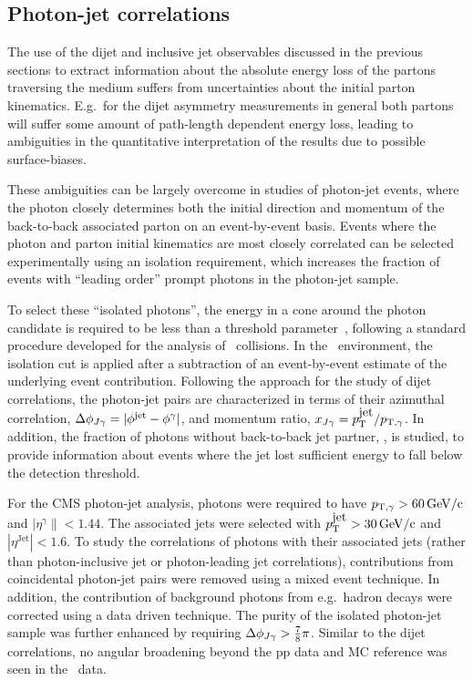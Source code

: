 \subsection{Photon-jet correlations}

The use of the dijet and inclusive jet observables discussed in the previous sections 
to extract information
about the absolute energy loss of the partons traversing the medium suffers from
uncertainties about the initial parton kinematics. E.g.\ for the dijet asymmetry 
measurements in general both partons will suffer some amount of path-length dependent
energy loss, leading to ambiguities in the quantitative interpretation of the results
due to possible surface-biases. 

These ambiguities can be largely overcome in studies of photon-jet events, 
where the photon closely determines both the initial direction and momentum 
of the back-to-back associated parton on an event-by-event basis.
Events where the photon and parton initial kinematics are most closely correlated 
can be selected experimentally using an isolation requirement, which 
increases the fraction of events with ``leading order'' prompt photons in
the photon-jet sample. 

To select these ``isolated photons'', the energy in a cone around 
the photon candidate is required to be less than a threshold parameter~\cite{HIPhoton},
following a standard procedure developed for the analysis of \pp\ collisions. In the \PbPb\ 
environment, the isolation cut is applied after a subtraction of an event-by-event 
estimate of the underlying event contribution.
Following the approach for the study of dijet correlations, the photon-jet pairs 
are characterized in terms of their azimuthal correlation, $\Delta\phi_{J\gamma} = |\phi^\mathrm{jet} - \phi^{\gamma}|$,
 and momentum ratio, $x_{J\gamma} = p_{\mathrm{T}}^{\mbox{jet}}/p_{\mathrm{T},\gamma}$. In addition, the fraction of photons without 
back-to-back jet partner,  \rjg, is studied, to provide information about 
events where the jet lost sufficient energy to fall below the detection threshold.

For the CMS photon-jet analysis, photons were required to have $p_{\mathrm{T},\gamma} > 60\,\mathrm{GeV/c}$
and  $|\eta^\gamma\|<1.44$. The associated jets were selected with
$p_{\mathrm{T}}^{\mbox{jet}} > 30\,\mathrm{GeV/c}$ and $|\eta^{\mbox{Jet}}|<1.6$. To study the correlations of 
photons with their associated jets (rather than photon-inclusive jet or photon-leading 
jet correlations), contributions from 
coincidental photon-jet pairs were removed using a mixed event technique. In 
addition, the contribution of background photons from e.g.\ hadron decays 
were corrected using a data driven technique. The purity of the isolated photon-jet
sample was further enhanced by requiring $\Delta\phi_{J\gamma} > \frac{7}{8}\pi$.
Similar to the dijet correlations, no angular broadening 
beyond the pp data and MC reference was seen in the \PbPb\ data.

